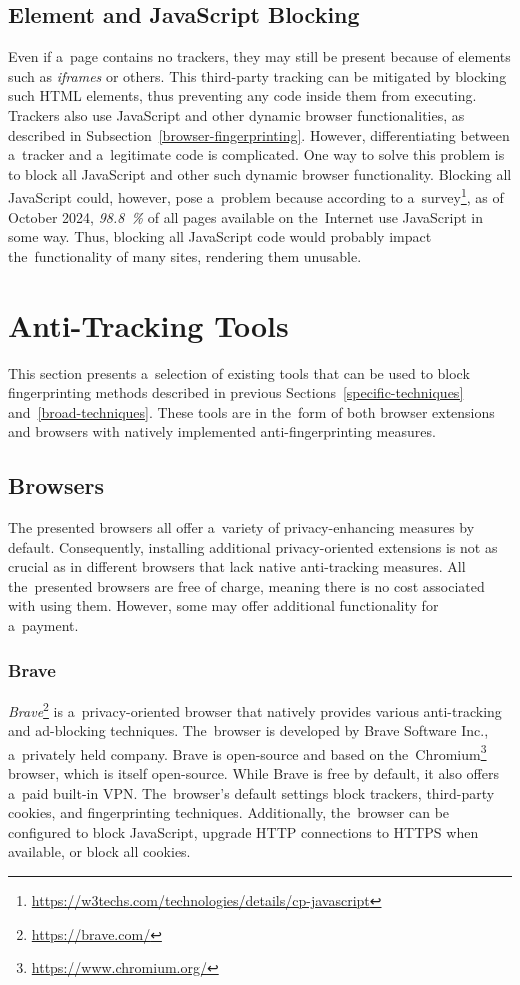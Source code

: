 \subsection{Element and JavaScript Blocking}
\label{element-blocking}
Even if a~page contains no trackers, they may still be present because of elements such as \textit{iframes} or others. This third-party tracking can be mitigated by blocking such HTML elements, thus preventing any code inside them from executing. Trackers also use JavaScript and other dynamic browser functionalities, as described in Subsection~\ref{browser-fingerprinting}. However, differentiating between a~tracker and a~legitimate code is complicated. One way to solve this problem is to block all JavaScript \cite{domain-blocking} and other such dynamic browser functionality. Blocking all JavaScript could, however, pose a~problem because according to a~survey\footnote{\url{https://w3techs.com/technologies/details/cp-javascript}}, as of October 2024, \textit{98.8~\%} of all pages available on the~Internet use JavaScript in some way. Thus, blocking all JavaScript code would probably impact the~functionality of many sites, rendering them unusable.

\section{Anti-Tracking Tools}
\label{Section-Anti-tracking}
This section presents a~selection of existing tools that can be used to block fingerprinting methods described in previous Sections~\ref{specific-techniques} and~\ref{broad-techniques}. These tools are in the~form of both browser extensions and browsers with natively implemented anti-fingerprinting measures.

\subsection{Browsers}
The presented browsers all offer a~variety of privacy-enhancing measures by default. Consequently, installing additional privacy-oriented extensions is not as crucial as in different browsers that lack native anti-tracking measures. All the~presented browsers are free of charge, meaning there is no cost associated with using them. However, some may offer additional functionality for a~payment.

\subsubsection{Brave}
\textit{Brave}\footnote{\url{https://brave.com/}} is a~privacy-oriented browser that natively provides various anti-tracking and ad-blocking techniques. The~browser is developed by Brave Software Inc., a~privately held company. Brave is open-source and based on the~Chromium\footnote{\url{https://www.chromium.org/}} browser, which is itself open-source. While Brave is free by default, it also offers a~paid built-in VPN. The~browser's default settings block trackers, third-party cookies, and fingerprinting techniques. Additionally, the~browser can be configured to block JavaScript, upgrade HTTP connections to HTTPS when available, or block all cookies.

